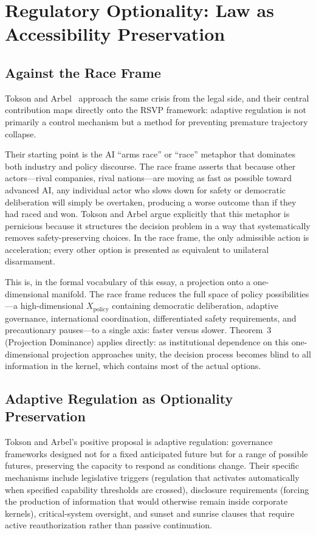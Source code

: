 \documentclass[12pt, a4paper]{article}
\theoremstyle{plain}
\theoremstyle{definition}
\theoremstyle{remark}
\begin{document}
\section{Regulatory Optionality: Law as Accessibility Preservation}

\subsection{Against the Race Frame}

Tokson and Arbel~\cite{ToksonArbel2027} approach the same crisis from the legal side,
and their central contribution maps directly onto the RSVP framework: adaptive
regulation is not primarily a control mechanism but a method for preventing
premature trajectory collapse.

Their starting point is the AI ``arms race'' or ``race'' metaphor that dominates
both industry and policy discourse.
The race frame asserts that because other actors---rival companies, rival nations---are
moving as fast as possible toward advanced AI, any individual actor who slows down
for safety or democratic deliberation will simply be overtaken, producing a worse
outcome than if they had raced and won.
Tokson and Arbel argue explicitly that this metaphor is pernicious because it
structures the decision problem in a way that systematically removes safety-preserving
choices.
In the race frame, the only admissible action is acceleration; every other option
is presented as equivalent to unilateral disarmament.

This is, in the formal vocabulary of this essay, a projection onto a one-dimensional
manifold.
The race frame reduces the full space of policy possibilities---a high-dimensional
$X_{\mathrm{policy}}$ containing democratic deliberation, adaptive governance,
international coordination, differentiated safety requirements, and precautionary
pauses---to a single axis: faster versus slower.
Theorem~3 (Projection Dominance) applies directly: as institutional dependence
on this one-dimensional projection approaches unity, the decision process becomes
blind to all information in the kernel, which contains most of the actual options.

\subsection{Adaptive Regulation as Optionality Preservation}

Tokson and Arbel's positive proposal is adaptive regulation: governance frameworks
designed not for a fixed anticipated future but for a range of possible futures,
preserving the capacity to respond as conditions change.
Their specific mechanisms include legislative triggers (regulation that activates
automatically when specified capability thresholds are crossed), disclosure
requirements (forcing the production of information that would otherwise remain
inside corporate kernels), critical-system oversight, and sunset and sunrise clauses
that require active reauthorization rather than passive continuation.
\end{document}

